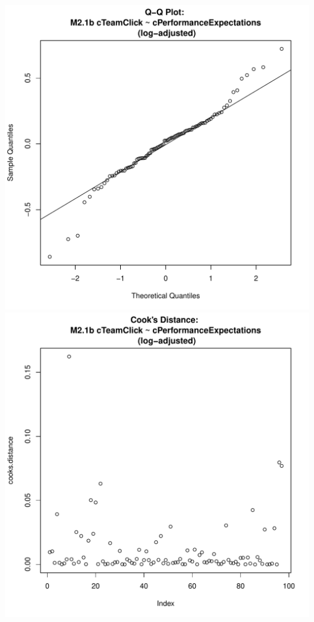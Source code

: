 \documentclass[12pt]{report}
\begin{document}
\includegraphics[scale =.4]{../images/MLM21bLogQQNorm.pdf}
\includegraphics[scale =.4]{../images/MLM21bLogCooksD.pdf}

\centering
\end{document}
